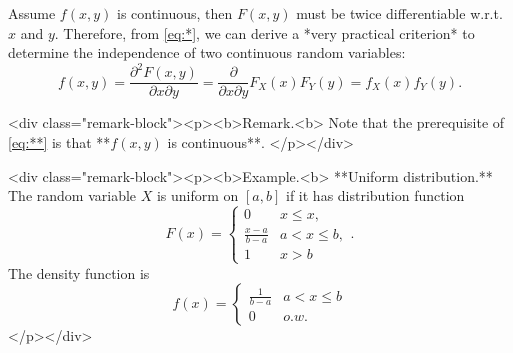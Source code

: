 Assume $f(x,y)$ is continuous, then $F(x,y)$ must be twice differentiable w.r.t. $x$ and $y$. Therefore, from \eqref{eq:*}, we can derive a *very practical criterion* to determine the independence of two continuous random variables:
$$$$\begin{equation}
    \label{eq:**}
    \tag{**}
    f(x,y) = \frac{\partial^2 F(x,y)}{\partial x \partial y} = \frac{\partial}{\partial x \partial y} F_X(x) F_Y(y) = f_X(x) f_Y(y).
\end{equation}$$$$

<div class="remark-block"><p><b>Remark.<b> 
Note that the prerequisite of \eqref{eq:**} is that **$f(x,y)$ is continuous**.
</p></div>

<div class="remark-block"><p><b>Example.<b> 
**Uniform distribution.** The random variable $X$ is uniform on $[a, b]$ if it has distribution function
$$\begin{equation}
    F(x) = \begin{cases} 
        0 & x \leq x, \\ \frac{x-a}{b-a} & a < x \leq b, \\ 1 & x > b
    \end{cases}.
\end{equation}$$
The density function is
$$\begin{equation}
    f(x) = \begin{cases} \frac{1}{b-a} & a < x \leq b \\ 0 & o.w. \end{cases}
\end{equation}$$
</p></div>

